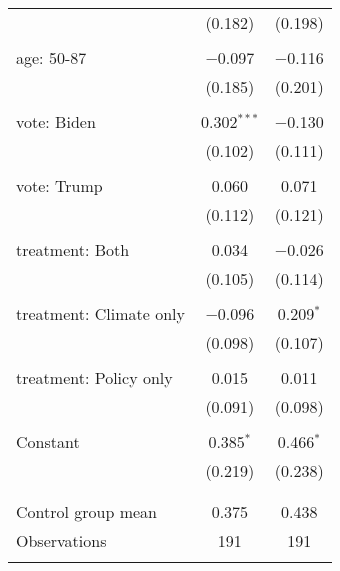 \begin{tabular}{@{\extracolsep{5pt}}lcc}
  & (0.182) & (0.198) \\ 
  & & \\ 
 age: 50-87 & $-$0.097 & $-$0.116 \\ 
  & (0.185) & (0.201) \\ 
  & & \\ 
 vote: Biden & 0.302$^{***}$ & $-$0.130 \\ 
  & (0.102) & (0.111) \\ 
  & & \\ 
 vote: Trump & 0.060 & 0.071 \\ 
  & (0.112) & (0.121) \\ 
  & & \\ 
 treatment: Both & 0.034 & $-$0.026 \\ 
  & (0.105) & (0.114) \\ 
  & & \\ 
 treatment: Climate only & $-$0.096 & 0.209$^{*}$ \\ 
  & (0.098) & (0.107) \\ 
  & & \\ 
 treatment: Policy only & 0.015 & 0.011 \\ 
  & (0.091) & (0.098) \\ 
  & & \\ 
 Constant & 0.385$^{*}$ & 0.466$^{*}$ \\ 
  & (0.219) & (0.238) \\ 
  & & \\ 
\hline \\[-1.8ex] 
Control group mean & 0.375 & 0.438 \\ 
Observations & 191 & 191 \\ 
\hline 
\hline \\[-1.8ex] 
\end{tabular} 
